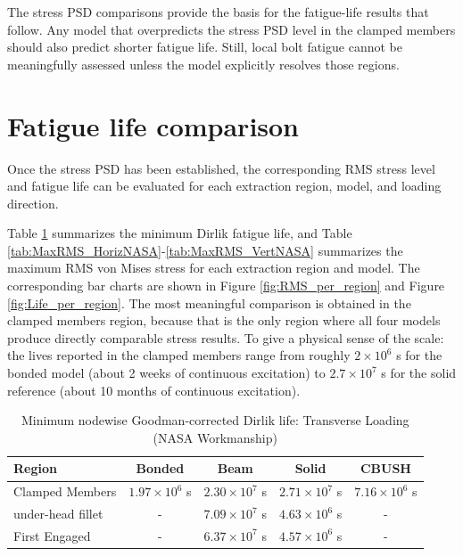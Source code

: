 \documentclass[a4paper,twoside]{bth}
\begin{document}
The stress \ac{PSD} comparisons provide the basis for the fatigue-life results that follow. Any model that overpredicts the stress \ac{PSD} level in the clamped members should also predict shorter fatigue life. Still, local bolt fatigue cannot be meaningfully assessed unless the model explicitly resolves those regions.

\newpage
\section{Fatigue life comparison} \label{sec:FatigueLifeCompare}

Once the stress \ac{PSD} has been established, the corresponding \ac{RMS} stress level and fatigue life can be evaluated for each extraction region, model, and loading direction.

Table \ref{tab:MinLife} summarizes the minimum Dirlik fatigue life, and Table \ref{tab:MaxRMS_HorizNASA}-\ref{tab:MaxRMS_VertNASA} summarizes the maximum \ac{RMS} von Mises stress for each extraction region and model. The corresponding bar charts are shown in Figure \ref{fig:RMS_per_region} and Figure \ref{fig:Life_per_region}. The most meaningful comparison is obtained in the clamped members region, because that is the only region where all four models produce directly comparable stress results. To give a physical sense of the scale: the lives reported in the clamped members range from roughly $2 \times 10^6$ s for the bonded model (about 2 weeks of continuous excitation) to $2.7 \times 10^7$ s for the solid reference (about 10 months of continuous excitation). 

\begin{table}[H]
    \centering
    \caption{Minimum nodewise Goodman-corrected Dirlik life: Transverse Loading (NASA Workmanship)}
    \label{tab:MinLife}
    \begin{tabular}{lcccc}
        \toprule
        Region          & Bonded               & Beam                  & Solid                 & CBUSH                  \\
        \midrule
        Clamped Members & $1.97\times10^{6}$ s & $2.30\times10^{7}$ s  & $2.71\times10^{7}$ s  & $7.16\times10^{6}$ s  \\
        under-head fillet   & -                   & $7.09\times10^{7}$ s  & $4.63\times10^{6}$ s  & -                    \\
        First Engaged   & -                   & $6.37\times10^{7}$ s  & $4.57\times10^{6}$ s  & -                    \\
        \bottomrule
    \end{tabular}
\end{table}
\end{document}
